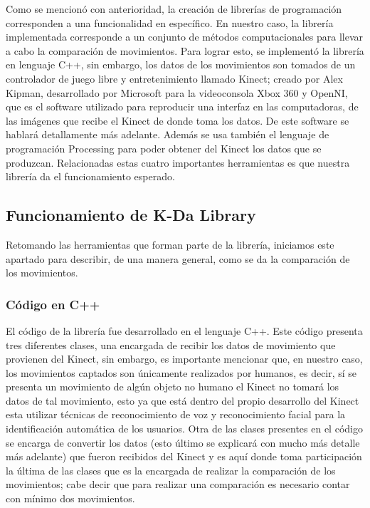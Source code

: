 \documentclass[letterpaper]{article}
\begin{document}
\quad \quad Como se mencionó con anterioridad, la creación de librerías de programación corresponden a una funcionalidad en específico. En nuestro caso, la librería
implementada corresponde a un conjunto de métodos computacionales para llevar a cabo la comparación de movimientos. Para lograr esto, se implementó 
la librería en lenguaje C++, sin embargo, los datos de los movimientos son tomados de un controlador de juego libre y entretenimiento llamado Kinect; creado por Alex Kipman, desarrollado por Microsoft para la videoconsola
Xbox 360 y OpenNI, que es el software utilizado para reproducir una interfaz en las computadoras, de las imágenes que recibe el Kinect de donde toma los datos. De este software se hablará detallamente más adelante. 
Además se usa también el lenguaje de programación Processing para poder obtener del Kinect los datos que se produzcan. Relacionadas estas cuatro importantes
herramientas es que nuestra librería da el funcionamiento esperado. 

\subsection{Funcionamiento de K-Da Library}

\quad \quad Retomando las herramientas que forman parte de la librería, iniciamos este apartado para describir, de una manera general, como se da la comparación de los movimientos.

\subsubsection{Código en C++}

\quad \quad El código de la librería fue desarrollado en el lenguaje C++. Este código presenta tres diferentes clases, una encargada de recibir los datos de movimiento que provienen del Kinect, sin embargo, es importante mencionar que, en nuestro caso, los movimientos captados son únicamente realizados por humanos, es decir, sí se presenta un movimiento de algún objeto no humano el Kinect no tomará los datos de tal movimiento,
esto ya que está dentro del propio desarrollo del Kinect esta utilizar técnicas de reconocimiento de voz y reconocimiento facial para la identificación automática de los usuarios. Otra de las clases presentes en el código se encarga de convertir los datos (esto último se explicará con mucho más detalle más adelante) que fueron 
recibidos del Kinect y es aquí donde toma participación la última de las clases que es la encargada de realizar la comparación de los movimientos; cabe decir que para realizar una comparación es necesario contar con mínimo dos movimientos.
\end{document}
